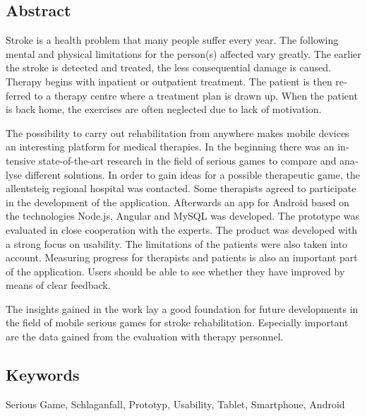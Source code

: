 
\begin{otherlanguage}{english}

\chapter*{Abstract}
Stroke is a health problem that many people suffer every year. The following mental and physical limitations for the person(s) affected vary greatly. The earlier the stroke is detected and treated, the less consequential damage is caused. Therapy begins with inpatient or outpatient treatment. The patient is then referred to a therapy centre where a treatment plan is drawn up. When the patient is back home, the exercises are often neglected due to lack of motivation.

The possibility to carry out rehabilitation from anywhere makes mobile devices an interesting platform for medical therapies. In the beginning there was an intensive state-of-the-art research in the field of serious games to compare and analyse different solutions. In order to gain ideas for a possible therapeutic game, the allentsteig regional hospital was contacted. Some therapists agreed to participate in the development of the application. Afterwards an app for Android based on the technologies Node.js, Angular and MySQL was developed. The prototype was evaluated in close cooperation with the experts. The product was developed with a strong focus on usability. The limitations of the patients were also taken into account. Measuring progress for therapists and patients is also an important part of the application. Users should be able to see whether they have improved by means of clear feedback.
  
The insights gained in the work lay a good foundation for future developments in the field of mobile serious games for stroke rehabilitation. Especially important are the data gained from the evaluation with therapy personnel.

\bigskip

\section*{Keywords}
Serious Game, Schlaganfall, Prototyp, Usability, Tablet, Smartphone, Android

\end{otherlanguage}
